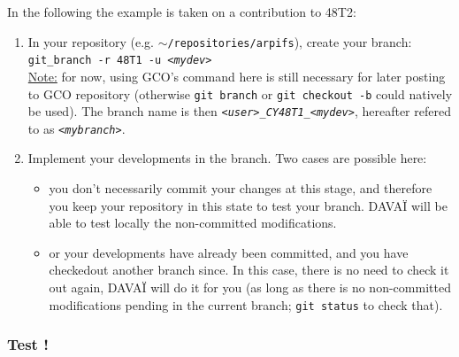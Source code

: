 \documentclass[a4paper,10pt,twoside]{article}
\begin{document}
\noindent In the following the example is taken on a contribution to 48T2:
\begin{enumerate}[label=(C.\arabic*)]
 \item In your repository (e.g. \texttt{$\sim$/repositories/arpifs}), create your branch:\\
 \texttt{git\_branch -r 48T1 -u \textit{<mydev>}}\\
 \underline{Note:} for now, using GCO's command here is still necessary for later posting to GCO repository (otherwise \texttt{git branch} or \texttt{git checkout -b} could natively be used). The branch name is then \textit{\texttt{<user>\_CY48T1\_<mydev>}}, hereafter refered to as \textit{\texttt{<mybranch>}}.
 \item Implement your developments in the branch.
 Two cases are possible here:
 \begin{itemize}
  \item you don't necessarily commit your changes at this stage, and therefore you keep your repository in this state to test your branch. DAVAÏ will be able to test locally the non-committed modifications. 
  \item or your developments have already been committed, and you have checkedout another branch since. In this case, there is no need to check it out again, DAVAÏ will do it for you (as long as there is no non-committed modifications pending in the current branch; \texttt{git status} to check that).
 \end{itemize}
\end{enumerate}


\subsubsection{Test !} 
\end{document}

